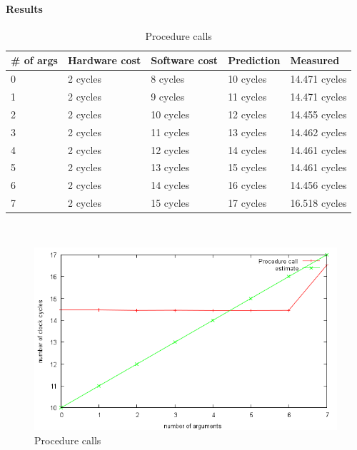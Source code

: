 \paragraph{Results}
\begin{table}[h]

\begin{center}
\begin{tabular}{| l | l | l | l | l |}
\hline
\# of args 	& Hardware cost 	& Software cost & Prediction & Measured \\ \hline
0 & 2 cycles 	& 8 cycles  		& 10 cycles 	& 14.471 cycles \\ \hline
1 & 2 cycles 	& 9 cycles  		& 11 cycles 	& 14.471 cycles \\ \hline
2 & 2 cycles 	& 10 cycles  		& 12 cycles 	& 14.455 cycles \\ \hline
3 & 2 cycles 	& 11 cycles 		& 13 cycles 	& 14.462 cycles \\ \hline
4 & 2 cycles 	& 12 cycles 		& 14 cycles 	& 14.461 cycles \\ \hline
5 & 2 cycles 	& 13 cycles 		& 15 cycles 	& 14.461 cycles \\ \hline
6 & 2 cycles 	& 14 cycles 		& 16 cycles 	& 14.456 cycles \\ \hline
7 & 2 cycles 	& 15 cycles 		& 17 cycles 	& 16.518 cycles \\ \hline
\end{tabular} \\
\end{center}
\caption{Procedure calls\label{tab:procCall}}
\end{table}
\begin{figure}[h]

\begin{center}
\includegraphics[scale=0.8]{procCallImage}
\end{center}
\caption{Procedure calls\label{fig:procCallf}}
\end{figure}

